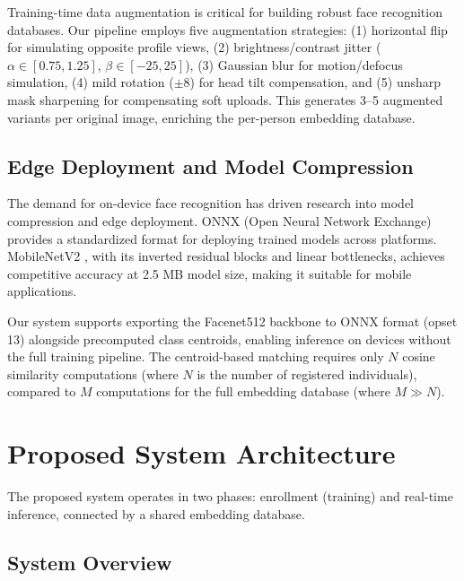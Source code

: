 \documentclass[conference]{IEEEtran}
\begin{document}
Training-time data augmentation is critical for building robust face recognition databases. Our pipeline employs five augmentation strategies: (1) horizontal flip for simulating opposite profile views, (2) brightness/contrast jitter ($\alpha \in [0.75, 1.25]$, $\beta \in [-25, 25]$), (3) Gaussian blur for motion/defocus simulation, (4) mild rotation ($\pm 8$\textdegree{}) for head tilt compensation, and (5) unsharp mask sharpening for compensating soft uploads. This generates 3--5 augmented variants per original image, enriching the per-person embedding database.

\subsection{Edge Deployment and Model Compression}

The demand for on-device face recognition has driven research into model compression and edge deployment. ONNX (Open Neural Network Exchange) \cite{b26} provides a standardized format for deploying trained models across platforms. MobileNetV2 \cite{b27}, with its inverted residual blocks and linear bottlenecks, achieves competitive accuracy at 2.5 MB model size, making it suitable for mobile applications.

Our system supports exporting the Facenet512 backbone to ONNX format (opset 13) alongside precomputed class centroids, enabling inference on devices without the full training pipeline. The centroid-based matching requires only $N$ cosine similarity computations (where $N$ is the number of registered individuals), compared to $M$ computations for the full embedding database (where $M \gg N$).

\section{Proposed System Architecture}

The proposed system operates in two phases: enrollment (training) and real-time inference, connected by a shared embedding database.

\subsection{System Overview}
\end{document}
